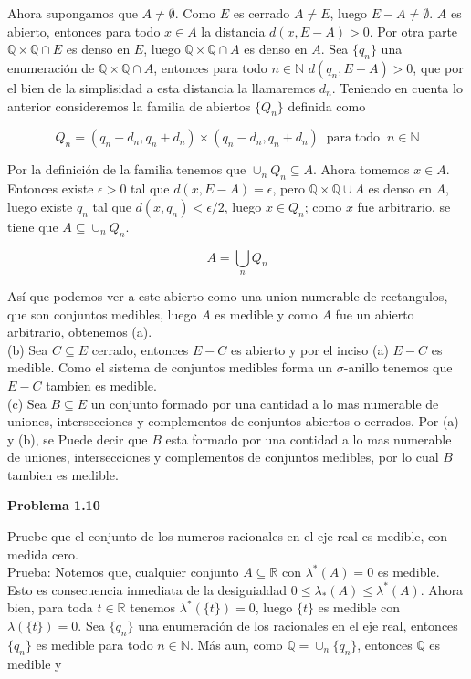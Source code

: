 \documentclass[12pt]{article}
\begin{document}
    Ahora supongamos que $A \neq \emptyset$. Como $E$ es cerrado $A \neq E$, luego
    $E-A \neq \emptyset$. $A$ es abierto, entonces para todo $x\in A$ la distancia 
    $d(x,E-A) > 0$. Por otra parte $\mathbb{Q}\times \mathbb{Q}\cap E$ es denso en $E$,
    luego $\mathbb{Q}\times \mathbb{Q}\cap A$ es denso en $A$. Sea $\{q_n\}$ una 
    enumeraci\'on de $\mathbb{Q}\times \mathbb{Q}\cap A$, entonces para todo $n\in \mathbb{N}$
    $d(q_n,E-A) > 0$, que por el bien de la simplisidad a esta distancia la llamaremos $d_n$.
    Teniendo en cuenta lo anterior consideremos la familia de abiertos $\{Q_n\}$ definida como

    \[Q_n = (q_n-d_n,q_n+d_n)\times (q_n-d_n,q_n+d_n)\;\; \mathrm{para\; todo}\;\; n\in \mathbb{N}\]
    

    \noindent Por la definici\'on de la familia tenemos que $\cup_n Q_n \subseteq A$. Ahora
    tomemos $x\in A$. Entonces existe $\epsilon > 0$ tal que $d(x,E-A) = \epsilon$, pero
    $\mathbb{Q}\times \mathbb{Q}\cup A$ es denso en $A$, luego existe $q_n$ tal que 
    $d(x,q_n) < \epsilon/2$, luego $x\in Q_n$; como $x$ fue arbitrario, se tiene que 
    $A\subseteq \cup_n Q_n$. 

    \[A = \bigcup_n Q_n\]

    \noindent As\'i que podemos ver a este abierto como una union numerable de rectangulos, que 
    son conjuntos medibles, luego $A$ es medible y como $A$ fue un abierto arbitrario, 
    obtenemos (a).
    \\

    (b) Sea $C\subseteq E$ cerrado, entonces $E-C$ es abierto y por el inciso (a) $E-C$ es 
    medible. Como el sistema de conjuntos medibles forma un $\sigma$-anillo tenemos que 
    $E-C$ tambien es medible.
    \\
    
    (c) Sea $B\subseteq E$ un conjunto formado por una cantidad a lo mas numerable de uniones,
    intersecciones y complementos de conjuntos abiertos o cerrados. Por (a) y (b), se Puede 
    decir que $B$ esta formado por una contidad a lo mas numerable de 
    uniones, intersecciones y complementos de conjuntos medibles, por lo cual $B$ tambien es 
    medible.
    \newpage

    \textbf{Problema 1.10}

    Pruebe que el conjunto de los numeros racionales en el eje real es medible, con 
    medida cero.
    \\

    Prueba: Notemos que, cualquier conjunto $A\subseteq\mathbb{R}$ con $\lambda^*(A) = 0$ es 
    medible. Esto es consecuencia inmediata de la desiguialdad 
    $0 \leq \lambda_*(A) \leq \lambda^*(A)$. Ahora bien, para toda $t\in \mathbb{R}$ tenemos 
    $\lambda^*(\{t\}) = 0$, luego $\{t\}$ es medible con $\lambda (\{t\}) = 0$. Sea $\{q_n\}$
    una enumeraci\'on de los racionales en el eje real, entonces $\{q_n\}$ es medible para 
    todo $n\in \mathbb{N}$. M\'as aun, como $\mathbb{Q} = \cup_n \{q_n\}$, entonces 
    $\mathbb{Q}$ es medible y 
    
\end{document}
